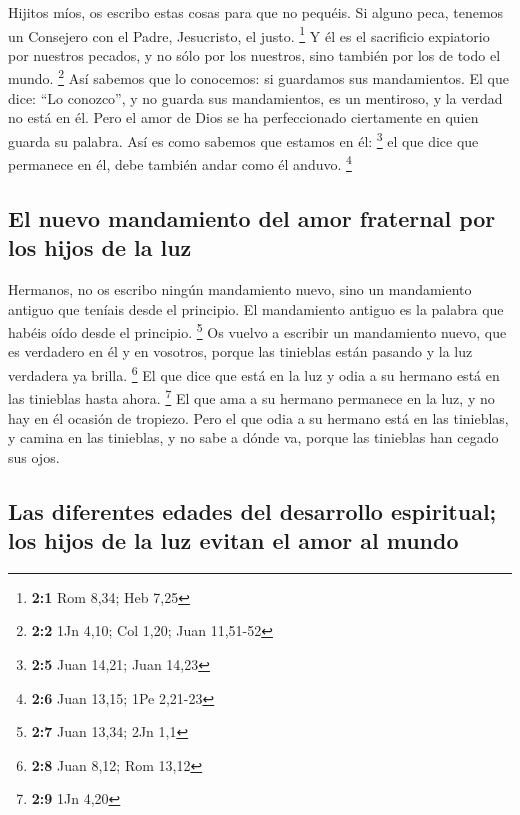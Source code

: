 \begin{paracol}{2}
 Hijitos míos, os escribo estas cosas para que no pequéis.
Si alguno peca, tenemos un Consejero con el Padre, Jesucristo, el justo.
\footnote{\textbf{2:1} Rom 8,34; Heb 7,25}  Y él es el
sacrificio expiatorio por nuestros pecados, y no sólo por los nuestros,
sino también por los de todo el mundo. \footnote{\textbf{2:2} 1Jn 4,10;
  Col 1,20; Juan 11,51-52}  Así sabemos que lo conocemos:
si guardamos sus mandamientos.  El que dice: ``Lo
conozco'', y no guarda sus mandamientos, es un mentiroso, y la verdad no
está en él.  Pero el amor de Dios se ha perfeccionado
ciertamente en quien guarda su palabra. Así es como sabemos que estamos
en él: \footnote{\textbf{2:5} Juan 14,21; Juan 14,23}  el
que dice que permanece en él, debe también andar como él anduvo.
\footnote{\textbf{2:6} Juan 13,15; 1Pe 2,21-23}

\hypertarget{el-nuevo-mandamiento-del-amor-fraternal-por-los-hijos-de-la-luz}{%
\subsection{El nuevo mandamiento del amor fraternal por los hijos de la
luz}\label{el-nuevo-mandamiento-del-amor-fraternal-por-los-hijos-de-la-luz}}

 Hermanos, no os escribo ningún mandamiento nuevo, sino un
mandamiento antiguo que teníais desde el principio. El mandamiento
antiguo es la palabra que habéis oído desde el principio. \footnote{\textbf{2:7}
  Juan 13,34; 2Jn 1,1}  Os vuelvo a escribir un
mandamiento nuevo, que es verdadero en él y en vosotros, porque las
tinieblas están pasando y la luz verdadera ya brilla. \footnote{\textbf{2:8}
  Juan 8,12; Rom 13,12}  El que dice que está en la luz y
odia a su hermano está en las tinieblas hasta ahora. \footnote{\textbf{2:9}
  1Jn 4,20}  El que ama a su hermano permanece en la luz,
y no hay en él ocasión de tropiezo.  Pero el que odia a
su hermano está en las tinieblas, y camina en las tinieblas, y no sabe a
dónde va, porque las tinieblas han cegado sus ojos.

\hypertarget{las-diferentes-edades-del-desarrollo-espiritual-los-hijos-de-la-luz-evitan-el-amor-al-mundo}{%
\subsection{Las diferentes edades del desarrollo espiritual; los hijos
de la luz evitan el amor al
mundo}\label{las-diferentes-edades-del-desarrollo-espiritual-los-hijos-de-la-luz-evitan-el-amor-al-mundo}}


\end{paracol}
